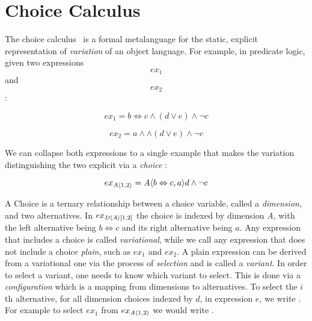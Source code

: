 \section{Choice Calculus}
\label{bk-cc}
The choice calculus~\cite{Walk13thesis, Erwig:2011:CCR:2063239.2063245} is a
formal metalanguage for the static, explicit representation of
\textit{variation} of an object language. For example, in predicate logic, given
two expressions \[ex_1\] and \[ex_2\]:

\[ex_1 = b \Leftrightarrow c \wedge (d \vee e) \wedge \neg c \]

\[ex_2 = a \wedge \wedge (d \vee e) \wedge \neg c \]

We can collapse both expressions to a single example that makes the variation
distinguishing the two explicit via a \textit{choice} :

\[ex_{\chc[A]{1,2}} = \chc[A]{b \Leftrightarrow c, a} d \wedge \neg c  \]

A Choice is a ternary relationship between a choice variable, called a
\textit{dimension}, and two alternatives. In $ex_{\chc{A}[1,2]}$ the choice is
indexed by dimension \textit{A}, with the left alternative being $ b
\Leftrightarrow c$ and its right alternative being $a$. Any expression that
includes a choice is called \textit{variational}, while we call any expression
that does not include a choice \textit{plain}, such as $ex_1$ and $ex_2$. A
plain expression can be derived from a variational one via the process of
\textit{selection} and is called a \textit{variant}. In order to select a
variant, one needs to know which variant to select. This is done via a
\textit{configuration} which is a mapping from dimensions to alternatives. To
select the $i$th alternative, for all dimension choices indexed by $d$, in
expression $e$, we write . For example to select $ex_1$ from
$ex_{\chc[A]{1,2}}$ we would write .
